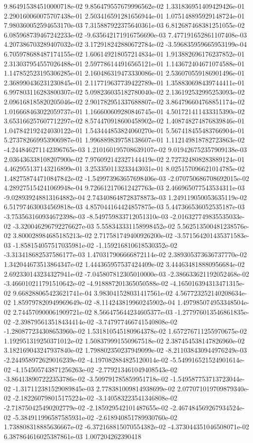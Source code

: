 	9.864915384510000718e-02	9.856479557679996562e-02	1.331836951409429426e-01	2.290160060075707438e-01	2.503416591281656944e-01	1.075148895929148724e-01	7.980360052594653170e-03	7.315887922375640361e-03	6.812687468381251055e-02	6.085968739467242233e-02	-9.635642171916756690e-03	7.477191652861107408e-03	4.207386703289407032e-02	3.172918242880672784e-02	-3.596835959665953199e-04	6.705978688487174155e-02	1.606149218057214834e-01	1.913882696176237852e-01	2.313037954557026488e-01	2.597786144916565121e-01	1.143672404671074588e-01	1.147852523195306285e-01	2.160486319473330086e-01	2.536070559186901496e-01	2.368990436231230845e-01	2.117719637739422789e-01	1.358830698439744411e-01	6.997803116283800307e-02	5.098236035182780040e-02	2.136192532995253093e-02	2.096168185820205046e-02	2.901782951337688807e-02	3.864796604768851174e-02	1.016668463022059737e-01	1.166600609280846745e-01	4.501721411433315390e-02	3.653166257607712297e-02	8.574470918600458902e-02	1.408748274876839846e-01	1.047842192424030122e-01	1.543444853824060270e-01	5.567418455483766904e-01	5.273782669953906987e-01	1.996889839758138607e-01	1.112149818782723863e-02	-4.244846271142396765e-03	1.210160195708639107e-02	9.019426752357909138e-03	2.036436338108207900e-02	7.976092142327144419e-02	2.727324808283889124e-01	4.462955137143216899e-01	3.253350113233443031e-01	8.025157096621014785e-02	1.482758744710847842e-02	-1.549973963657698406e-03	-2.070750686708692015e-02	4.289275154241069948e-04	9.726612170612427763e-03	2.466965077543534311e-03	-9.028939248813164882e-04	2.743408648728378873e-03	1.249119050053635119e-02	6.517974630034569818e-03	4.857044164424857875e-03	5.447366536052535187e-03	-3.753563160934672398e-03	-8.549759833712051310e-03	-2.016327749835535033e-02	-3.320046296792276627e-03	5.558343331158998452e-02	5.562513500481238576e-02	3.800028984685185213e-02	2.717581749400926200e-02	-3.571564201435371583e-03	-1.858154057517035981e-02	-1.159216810618530352e-02	-3.313418682537586177e-03	1.470317906666872114e-02	2.389305373636737770e-02	1.342044673513864347e-02	1.444365957537424409e-02	3.444634818880956684e-02	2.692330143234327941e-02	-7.045807812305010000e-03	-2.386633621192052468e-02	-3.466010211791510642e-02	-4.918887201365050588e-02	-4.165016394313471315e-02	9.668288065423621741e-04	3.983041528031417561e-02	4.567723252140208634e-02	1.859797820949969649e-02	-8.114243819960245902e-04	1.497985074953348504e-02	2.744570900061909721e-02	8.566475644234605377e-03	-1.277976013546861835e-02	-2.398795613518434414e-02	-3.747977466741540808e-02	-1.280877234308653960e-02	1.531810545180964378e-02	1.657276711255970675e-02	1.192951319250371012e-02	1.508379991550967518e-02	2.387454538147826960e-02	3.182169043247937840e-02	1.798802350237949099e-02	-8.211038430944976249e-03	-2.244958972629016239e-02	-4.197082884825120014e-02	-5.549916521524901614e-02	-4.154505743871256263e-02	-2.779213461049408543e-02	-3.864138907222353786e-02	-3.509791785859951718e-02	-1.549587753713723044e-02	-1.317112381529089845e-03	2.778381009814938699e-02	2.077071019709879340e-02	-2.182260798015175224e-02	-3.140583223541346808e-02	-2.718750425490202779e-02	-2.185929542101487655e-02	-2.467484569267934524e-02	-5.384911996587585931e-02	-2.618940851789930760e-02	1.738808318885636667e-02	-6.372168815070554382e-02	-4.373044351046508071e-02	6.387864616025387861e-03	1.007204262390418